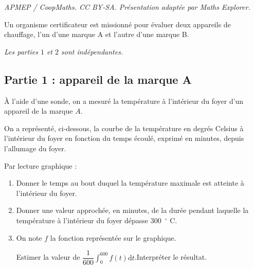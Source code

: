 \documentclass[10pt]{article}
\renewcommand{\d}{{\mathrm{d}}}
\begin{document}
\noindent\textit{APMEP / CoopMaths. CC BY-SA. Présentation adaptée par Maths Explorer.}\par\medskip
Un organisme certificateur est missionné pour évaluer deux appareils de chauffage, l'un d'une marque A et l'autre d'une marque B.

\begin{center}
\textit{Les parties $1$ et $2$ sont indépendantes.}
\end{center}

\subsection*{Partie 1 : appareil de la marque A}

À l'aide d'une sonde, on a mesuré la température à l'intérieur du foyer d'un appareil de la marque $A$.

On a représenté, ci-dessous, la courbe de la température en degrés Celsius à l'intérieur du foyer en fonction du temps écoulé, exprimé en minutes, depuis l'allumage du foyer.

\begin{center}
\end{center}

Par lecture graphique :

\begin{enumerate}
	\item Donner le temps au bout duquel la température maximale est atteinte à l'intérieur du foyer.
	\item Donner une valeur approchée, en minutes, de la durée pendant laquelle la température à l'intérieur du foyer dépasse $300$~\ensuremath{^\circ} C.
	\item On note $f$ la fonction représentée sur le graphique.

	Estimer la valeur de \quad $\displaystyle\dfrac{1}{600} \int_{0}^{600} f(t) \d t$.\quad Interpréter le résultat.
\end{enumerate}
\end{document}

